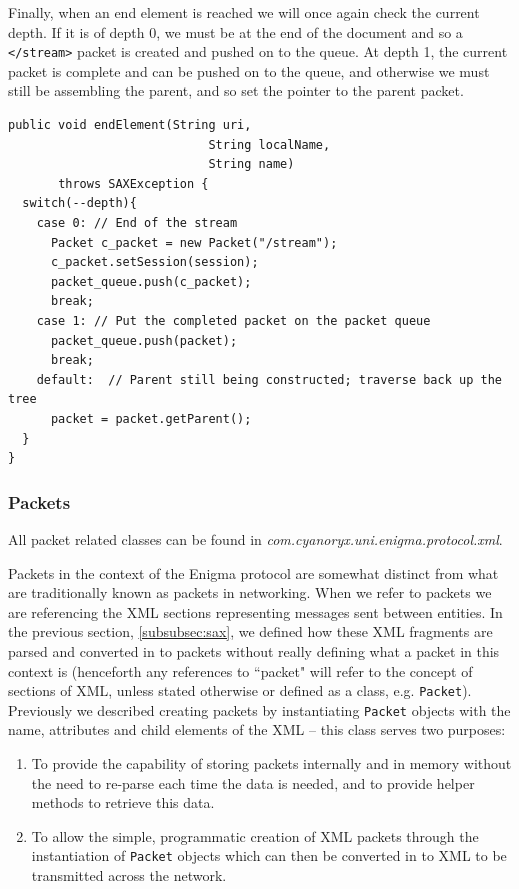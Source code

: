     Finally, when an end element is reached we will once again check the current depth. If it is of depth 0, we must be at the end of the document and so a \verb!</stream>! packet is created and pushed on to the queue. At depth 1, the current packet is complete and can be pushed on to the queue, and otherwise we must still be assembling the parent, and so set the pointer to the parent packet. \\
    
    \begin{lstlisting}
public void endElement(String uri,
                            String localName,
                            String name)
       throws SAXException {
  switch(--depth){
    case 0: // End of the stream
      Packet c_packet = new Packet("/stream");
      c_packet.setSession(session);
      packet_queue.push(c_packet);
      break;
    case 1: // Put the completed packet on the packet queue
      packet_queue.push(packet);
      break;
    default:  // Parent still being constructed; traverse back up the tree
      packet = packet.getParent();
  }
}
    \end{lstlisting}
    
    \subsubsection{Packets}
    \label{subsubsec:packets}
    
    All packet related classes can be found in \emph{com.cyanoryx.uni.enigma.protocol.xml}.
    
    Packets in the context of the Enigma protocol are somewhat distinct from what are traditionally known as packets in networking. When we refer to packets we are referencing the XML sections representing messages sent between entities. In the previous section, \textsection\ref{subsubsec:sax}, we defined how these XML fragments are parsed and converted in to packets without really defining what a packet in this context is (henceforth any references to ``packet" will refer to the concept of sections of XML, unless stated otherwise or defined as a class, e.g. \verb!Packet!). Previously we described creating packets by instantiating \verb!Packet! objects with the name, attributes and child elements of the XML -- this class serves two purposes:
    
    \begin{enumerate}
      \item To provide the capability of storing packets internally and in memory without the need to re-parse each time the data is needed, and to provide helper methods to retrieve this data.
      \item To allow the simple, programmatic creation of XML packets through the instantiation of \verb!Packet! objects which can then be converted in to XML to be transmitted across the network.
    \end{enumerate}
    
